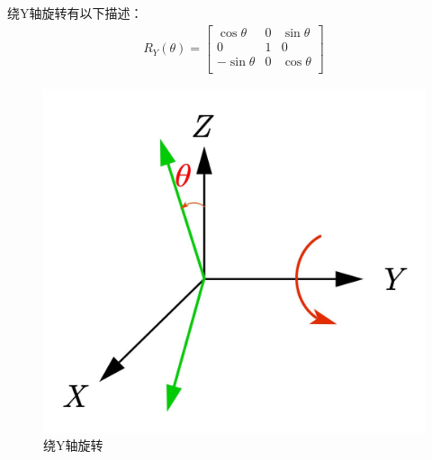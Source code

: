 \documentclass{article}
\begin{document}
绕Y轴旋转有以下描述：
\begin{gather}
	R_Y\left( \theta \right) =\left[ \begin{matrix}
		\cos \theta&		0&		\sin \theta\\
		0&		1&		0\\
		-\sin \theta&		0&		\cos \theta\\
	\end{matrix} \right] 		
\end{gather}

\begin{figure}[H]
	\begin{center}
		\includegraphics{旋转矩阵Y}
		\caption{绕Y轴旋转}
		\label{绕Y轴旋转}
	\end{center}
\end{figure}
\end{document}
